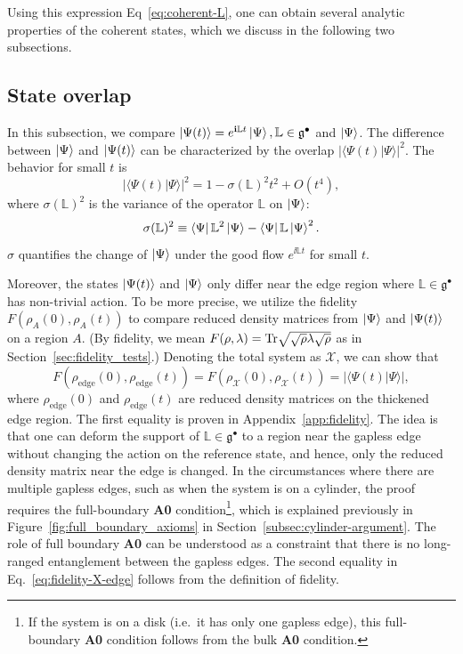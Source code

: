 \documentclass[12pt, nofootinbib]{article}
\theoremstyle{plain}
\theoremstyle{assumption}
\theoremstyle{definition}
\theoremstyle{plain}
\theoremstyle{plain}
\theoremstyle{plain}
\theoremstyle{plain}
\theoremstyle{plain}
\def\Lb{\mathbb{L}}
\def\gc{\mathfrak{g}^{\bullet}}
\begin{document}
Using this expression Eq~\eqref{eq:coherent-L}, one can obtain several analytic properties of the coherent states, which we  discuss in the following two subsections.


\subsection{State overlap}
\label{subsec:state-difference}

In this subsection, we compare $\ket{\Psi(t)} = e^{\ii \Lb t}\ket{\Psi},
\Lb\in\gc$ and $\left|\Psi\right\rangle$. The difference between $\left|\Psi\right\rangle$ and $\left|\Psi(t)\right\rangle$ can be characterized by the overlap $|\langle \Psi(t)|\Psi\rangle|^2$. The behavior for small $t$ is
\begin{equation}
    |\langle \Psi(t)|\Psi\rangle|^2 = 1 - \sigma(\Lb)^2 t^2 + O(t^4),
\end{equation}
where $\sigma(\Lb)^2$ is the variance of the operator $\Lb$ on $\left|\Psi\right\rangle$: 
\begin{equation}
    \sigma(\Lb)^2\equiv \bra{\Psi}\Lb^2\ket{\Psi} - \bra{\Psi}\Lb\ket{\Psi}^2. 
\end{equation}
$\sigma$ quantifies the change of $\left|\Psi\right\rangle$ under the good flow $e^{\ii \Lb t}$ for small $t$. 

Moreover, the states $\left|\Psi(t)\right\rangle$ and $\left|\Psi\right\rangle$ only differ near the edge region where $\Lb\in\gc$ has non-trivial action. To be more precise, we utilize the fidelity $F(\rho_A(0),\rho_A(t))$ to compare reduced density matrices from $\left|\Psi\right\rangle$ and $\left|\Psi(t)\right\rangle$ on a region $A$. (By fidelity, we mean $F(\rho,\lambda)={{\rm Tr}}\sqrt{\sqrt{\rho}\lambda \sqrt{\rho}}$ as in Section~\ref{sec:fidelity_tests}.) Denoting the total system as $\mathcal{X}$, we can show that
\begin{equation}\label{eq:fidelity-X-edge}
    F(\rho_{\mathrm{edge}}(0),\rho_{\mathrm{edge}}(t)) = F(\rho_{\mathcal{X}}(0),\rho_{\mathcal{X}}(t)) = |\langle \Psi(t)|\Psi\rangle|,
\end{equation}
where $\rho_{\mathrm{edge}}(0)$ and $\rho_{\mathrm{edge}}(t)$ are reduced density matrices on the thickened edge region. The first equality is proven in Appendix~\ref{app:fidelity}. 
The idea is that one can deform the support of $\Lb\in\gc$ to a region near the gapless edge without changing the action on the reference state, and hence, only the reduced density matrix near the edge is changed. In the circumstances where there are multiple gapless edges, such as when the system is on a cylinder, the proof requires the full-boundary {\bf A0} condition\footnote{If the system is on a disk (i.e.~it has only one gapless edge), this full-boundary {\bf A0} condition follows from the bulk {\bf A0} condition.}, which is explained previously in Figure~\ref{fig:full_boundary_axioms} in Section~\ref{subsec:cylinder-argument}. The role of full boundary {\bf A0} can be understood as a constraint that there is no long-ranged entanglement between the gapless edges.
The second equality in Eq.~\eqref{eq:fidelity-X-edge} follows from the definition of fidelity. 
\end{document}
